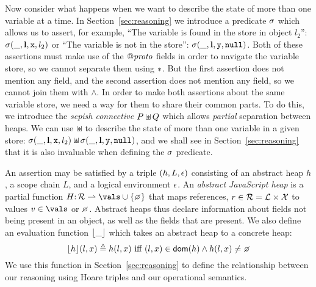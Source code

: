 \documentclass{article}
\begin{document}
Now consider what happens when we want to describe the state of more
than one variable at a time. In Section~\ref{sec:reasoning} we
introduce a predicate $\sigma$ which allows us to assert, for example,
``The variable  is found in the store in object $l_2$'':
$\sigma(\_,\textbf{l},\mbox{\texttt{{\upshape x}}},l_2)$ or ``The variable  is not in the
store'': $\sigma(\_,\textbf{l},\mbox{\texttt{{\upshape y}}},\mbox{\texttt{{\upshape null}}})$. Both of these assertions must make
use of the $\mathit{@proto}$ fields in order to navigate the variable store,
so we cannot separate them using $\mathbin{*}$.
But the first assertion does not mention any  field, and the
second assertion does not mention any  field, so we cannot join
them with $\land$. In order to make
both assertions about the same variable store, we need a way for them
to share their common parts. To do this, we introduce the {\em sepish
  connective} $P \mathbin{\sqcup\mkern-10mu*} Q$ which allows {\em partial} separation
between heaps. We can use $\mathbin{\sqcup\mkern-10mu*}$ to describe the state of more than
one variable in a given store:
$\sigma(\_,\textbf{l},\mbox{\texttt{{\upshape x}}},l_2)\mathbin{\sqcup\mkern-10mu*}\sigma(\_,\textbf{l},\mbox{\texttt{{\upshape y}}},\mbox{\texttt{{\upshape null}}})$,  and we
shall see in Section~\ref{sec:reasoning} that it is also
invaluable when defining the $\sigma$ predicate.


An assertion may be satisfied by a triple $(h,L,{\epsilon})$ consisting of an
{abstract heap} $h$, a scope chain $L$, and a {logical environment} $\epsilon$.
An {\em  abstract JavaScript heap}  is a partial function $H \ty \refs
\rightharpoonup \vals \cup \{\none\}$ that maps { references}, $r \in
\mathcal{R}= \mathcal{L} \times \mathcal{X} $  to values $v\in \vals$ or $\none$. Abstract heaps thus declare information about fields not being present in an object,
as well as the fields that are present. 
We also define an evaluation function $\lfloor\_\rfloor$ which takes an abstract heap to a concrete heap: 
%
\[\heval{h}(l,x) \triangleq h(l,x) \text{ iff } (l,x) \in \domain(h) \land h(l,x) \not= \none\]
We use this function in Section~\ref{sec:reasoning} to define the
relationship between our reasoning using Hoare triples and our operational semantics. 

\end{document}
